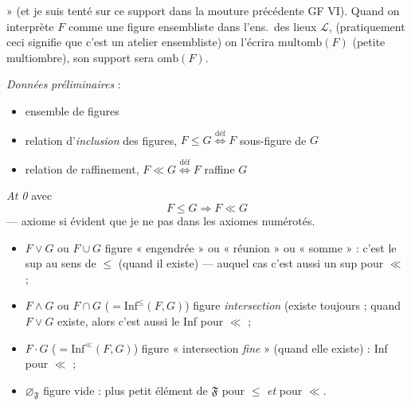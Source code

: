 \documentclass[11pt,a4paper]{article}
\begin{document}

» (et je suis tenté  sur ce support dans la mouture précédente GF VI). Quand on interprète $F$ comme une figure ensembliste dans l'ens.\ des lieux $\mathcal{L}$,  (pratiquement ceci signifie que c'est un atelier ensembliste) on l'écrira $\mathrm{multomb}(F)$ (petite multiombre), son support sera $\mathrm{omb}(F)$.

\emph{Données} \emph{préliminaires} :
\begin{itemize}
  \item[$\mathfrak{F}$] ensemble de figures
  \item[$\leq$] relation d'\emph{inclusion} des figures, $F \leq G \overset{\mathrm{déf}}{\Longleftrightarrow} F$ sous-figure de $G$
  \item[$\ll$] relation de raffinement, $F \ll G \overset{\mathrm{déf}}{\Longleftrightarrow} F$ raffine $G$
\end{itemize}

\emph{At 0} \quad avec
\[
  F \leq G \Longrightarrow F \ll G
\]
— axiome si évident que je ne  pas  dans les axiomes numérotés.


\begin{itemize}
  \item[(a)] $F \vee G$ ou $F \cup G$ \quad figure « engendrée » ou « réunion » ou « somme » : c'est le sup au sens de $\leq$ (quand il existe) — auquel cas c'est aussi un sup pour $\ll$  ;
  \item[(b)] $F \wedge G$ ou $F \cap G$ ($= \mathrm{Inf}^{\leq}(F, G)$) \quad figure \emph{intersection} (existe toujours  ; quand  $F \vee G$ existe, alors c'est aussi le Inf pour $\ll$ ;
  \item[(c)] $F \cdot G$ ($= \mathrm{Inf}^{\ll}(F, G)$) \quad figure « intersection \emph{fine} » (quand elle existe) : Inf pour $\ll$ ;
  \item[(d)] $\varnothing_{\mathfrak{F}}$ \quad figure vide : plus petit élément de $\mathfrak{F}$ pour $\leq$ \emph{et} pour $\ll$.
\end{itemize}
\end{document}
